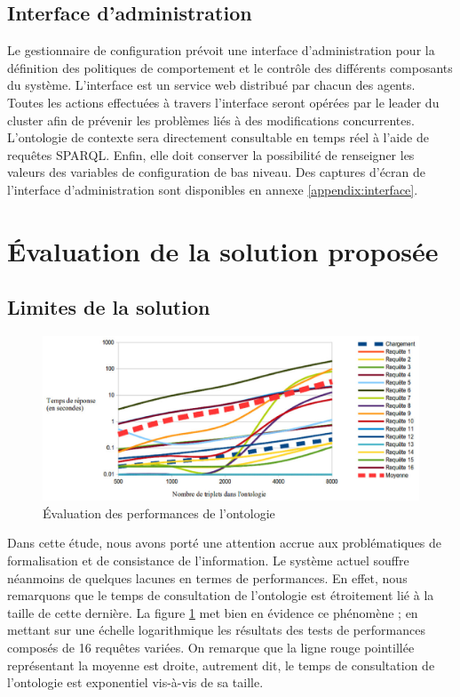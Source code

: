 \subsection{Interface d'administration}

Le gestionnaire de configuration prévoit une interface d'administration
pour la définition des politiques de comportement et le contrôle des différents
composants du système. L'interface est un service web distribué par
chacun des agents. Toutes les actions effectuées à travers l'interface seront
opérées par le leader du cluster afin de prévenir les problèmes liés à des
modifications concurrentes. L'ontologie de contexte sera directement
consultable en temps réel à l'aide de requêtes SPARQL. Enfin, elle doit
conserver la possibilité de renseigner les valeurs des variables de
configuration de bas niveau. Des captures d'écran de l'interface
d'administration sont disponibles en annexe \ref{appendix:interface}.

\section{Évaluation de la solution proposée}

\subsection{Limites de la solution}

\begin{figure}[H]
    \centering
    \includegraphics[width=\textwidth]{img/chart_sparql}
    \caption{Évaluation des performances de l'ontologie}
    \label{fig:chart}
\end{figure}

Dans cette étude, nous avons porté une attention accrue aux problématiques de
formalisation et de consistance de l'information. Le système actuel souffre
néanmoins de quelques lacunes en termes de performances. En effet, nous
remarquons que le temps de consultation de l'ontologie est étroitement lié à
la taille de cette dernière. La figure \ref{fig:chart} met bien en évidence ce
phénomène ; en mettant sur une échelle logarithmique les résultats des tests de
performances composés de 16 requêtes variées. On remarque que la ligne
rouge pointillée représentant la moyenne est droite, autrement dit, le temps de
consultation de l'ontologie est exponentiel vis-à-vis de sa taille.

